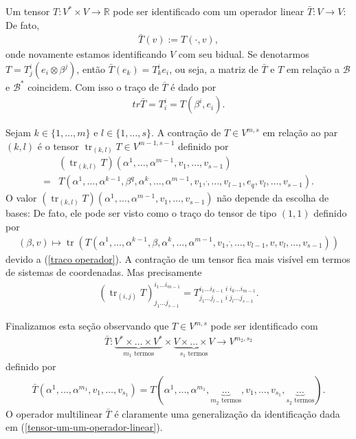 \documentclass[10pt,reqno]{amsart}
\DeclareMathOperator{\tr}{tr}
\begin{document}
Um tensor $T:V^\ast \times V \rightarrow \mathbb R$ pode ser identificado com um operador linear $\bar T:V \rightarrow V$: 
De fato, 
\begin{align}
\label{tensor-um-um-operador-linear}
\bar T(v) := T(\cdot, v),
\end{align} 
onde novamente estamos identificando $V$ com seu bidual.
Se denotarmos $T=T^i_j (e_i \otimes \beta^j)$, então $\bar T(e_k) = T^i_k e_i$, ou seja, a matriz de $\bar T$ e $T$ em relação a $\mathcal B$ e $\mathcal B^\ast$ coincidem.
Com isso o traço de $\bar T$ é dado por 
\begin{align}
\label{traco operador}
tr \bar T = T^i_i = T(\beta^i,e_i).
\end{align} 

Sejam $k\in \{1,\ldots, m\}$ e $l \in \{1, \ldots, s\}$. 
A contração de $T\in V^{m,s}$ em relação ao par $(k,l)$ é o tensor $\tr_{(k,l)}T \in V^{m-1,s-1}$ definido por
\begin{align*}
& (\tr_{(k,l)}T)(\alpha^1, \ldots, \alpha^{m-1}, v_1, \ldots, v_{s-1}) \\ 
= &T(\alpha^1, \ldots, \alpha^{k-1}, \beta^q, \alpha^k, \ldots, \alpha^{m-1}, v_1, \dot, \ldots, v_{l-1}, e_q, v_l, \ldots, v_{s-1}).
\end{align*}
O valor $(\tr_{(k,l)}T)(\alpha^1, \ldots, \alpha^{m-1}, v_1, \ldots, v_{s-1})$ não depende da escolha de bases:
De fato, ele pode ser visto como o traço do tensor de tipo $(1,1)$ definido por
\begin{align*}
(\beta, v) \mapsto \tr (T(\alpha^1, \ldots, \alpha^{k-1}, \beta, \alpha^k, \ldots, \alpha^{m-1}, v_1, \dot, \ldots, v_{l-1}, v, v_l, \ldots, v_{s-1}))
\end{align*}
devido a (\ref{traco operador}).
A contração de um tensor fica mais visível em termos de sistemas de coordenadas.
Mas precisamente
\begin{align*}
(\tr_{(i,j)} T)^{i_1\ldots i_{m-1}}_{j_1 \ldots j_{s-1}}=T^{i_1\ldots i_{k-1}\; i\; i_k \ldots i_{m-1}}_{j_1\ldots j_{l-1}\; i\; j_l \ldots j_{s-1}}.
\end{align*}

Finalizamos esta seção observando que $T \in V^{m,s}$ pode ser identificado com
\begin{align*}
\bar T: \underbrace{V^\ast \times \ldots \times V^\ast}_{m_1 \text{ termos}} \times \underbrace{V \times \ldots \times V}_{s_1 \text{ termos}} \rightarrow V^{m_2,s_2}
\end{align*}
definido por
\begin{align*}
\bar T(\alpha^1, \ldots, \alpha^{m_1},v_1, \ldots, v_{s_1}) = T(\alpha^1, \ldots, \alpha^{m_1}, \underbrace{\ldots}_{m_2 \text{ termos}}, v_1, \ldots, v_{s_1}, \underbrace{\ldots}_{s_2 \text{ termos}}).
\end{align*}
O operador multilinear $\bar T$ é claramente uma generalização da identificação dada em (\ref{tensor-um-um-operador-linear}).
\end{document}
